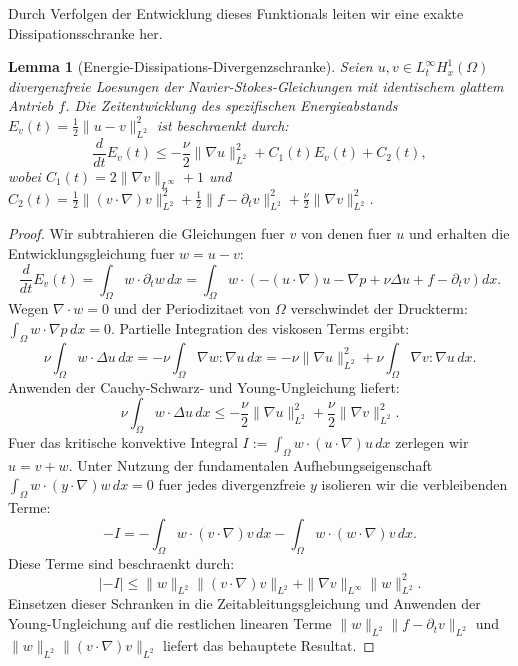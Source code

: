 \documentclass[12pt,a4paper]{article}
\theoremstyle{definition}
\theoremstyle{plain}
\newtheorem{lemma}[definition]{Lemma}
\theoremstyle{remark}
\begin{document}
Durch Verfolgen der Entwicklung dieses Funktionals leiten wir eine exakte Dissipationsschranke her.

\begin{lemma}[Energie-Dissipations-Divergenzschranke]
\label{lem:entropy-bound}
Seien $u, v \in L^\infty_t H^1_x(\Omega)$ divergenzfreie Loesungen der Navier-Stokes-Gleichungen mit identischem glattem Antrieb $f$. Die Zeitentwicklung des spezifischen Energieabstands $E_{v}(t) = \frac{1}{2}\| u - v \|_{L^2}^2$ ist beschraenkt durch:
\begin{equation}
    \frac{d}{dt} E_{v}(t) \le - \frac{\nu}{2} \|\nabla u\|_{L^2}^2 + C_1(t) E_{v}(t) + C_2(t),
\end{equation}
wobei $C_1(t) = 2\|\nabla v\|_{L^\infty} + 1$ und $C_2(t) = \frac{1}{2}\|(v \cdot \nabla)v\|_{L^2}^2 + \frac{1}{2}\|f - \partial_t v\|_{L^2}^2 + \frac{\nu}{2}\|\nabla v\|_{L^2}^2$.
\end{lemma}

\begin{proof}
Wir subtrahieren die Gleichungen fuer $v$ von denen fuer $u$ und erhalten die Entwicklungsgleichung fuer $w = u - v$:
\begin{equation}
    \frac{d}{dt} E_{v}(t) = \int_\Omega w \cdot \partial_t w \, dx = \int_\Omega w \cdot \left( -(u \cdot \nabla)u - \nabla p + \nu \Delta u + f - \partial_t v \right) dx.
\end{equation}
Wegen $\nabla \cdot w = 0$ und der Periodizitaet von $\Omega$ verschwindet der Druckterm: $\int_\Omega w \cdot \nabla p \, dx = 0$.
Partielle Integration des viskosen Terms ergibt:
\begin{equation}
    \nu \int_\Omega w \cdot \Delta u \, dx = - \nu \int_\Omega \nabla w : \nabla u \, dx = - \nu \|\nabla u\|_{L^2}^2 + \nu \int_\Omega \nabla v : \nabla u \, dx.
\end{equation}
Anwenden der Cauchy-Schwarz- und Young-Ungleichung liefert:
\begin{equation}
    \nu \int_\Omega w \cdot \Delta u \, dx \le - \frac{\nu}{2} \|\nabla u\|_{L^2}^2 + \frac{\nu}{2} \|\nabla v\|_{L^2}^2.
\end{equation}
Fuer das kritische konvektive Integral $I := \int_\Omega w \cdot (u \cdot \nabla)u \, dx$ zerlegen wir $u = v + w$. Unter Nutzung der fundamentalen Aufhebungseigenschaft $\int_\Omega w \cdot (y \cdot \nabla)w \, dx = 0$ fuer jedes divergenzfreie $y$ isolieren wir die verbleibenden Terme:
\begin{equation}
    - I = - \int_\Omega w \cdot (v \cdot \nabla)v \, dx - \int_\Omega w \cdot (w \cdot \nabla)v \, dx.
\end{equation}
Diese Terme sind beschraenkt durch:
\begin{equation}
    |-I| \le \|w\|_{L^2} \|(v \cdot \nabla)v\|_{L^2} + \|\nabla v\|_{L^\infty} \|w\|_{L^2}^2.
\end{equation}
Einsetzen dieser Schranken in die Zeitableitungsgleichung und Anwenden der Young-Ungleichung auf die restlichen linearen Terme $\|w\|_{L^2} \|f - \partial_t v\|_{L^2}$ und $\|w\|_{L^2} \|(v \cdot \nabla)v\|_{L^2}$ liefert das behauptete Resultat.
\end{proof}
\end{document}
